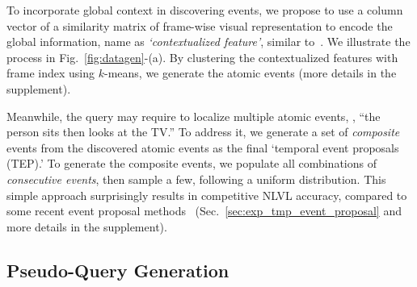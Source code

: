 To incorporate global context in discovering events, we propose to use a column vector of a similarity matrix of frame-wise visual representation to encode the global information, name as \emph{`contextualized feature'}, similar to~\cite{dwibedi2020counting}.
We illustrate the process in Fig.~\ref{fig:datagen}-(a).
By clustering the contextualized features with frame index using $k$-means, we generate the atomic events (more details in the supplement).

Meanwhile, the query may require to localize multiple atomic events, \eg, ``{the person sits then looks at the TV}.'' 
To address it, we generate a set of \emph{composite} events from the discovered atomic events as the final `temporal event proposals (TEP).'
To generate the composite events, we populate all combinations of \emph{consecutive events}, then sample a few, following a uniform distribution.
This simple approach surprisingly results in competitive NLVL accuracy, compared to some recent event proposal methods~\cite{jain2020actionbytes} (Sec.~\ref{sec:exp_tmp_event_proposal} and more details in the supplement).


%



\subsection{Pseudo-Query Generation}
\label{sec:approach:pseudoquery}

